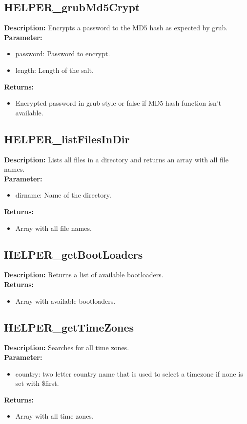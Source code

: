 \subsection{HELPER\_grubMd5Crypt}
\textbf{Description:} Encrypts a password to the MD5 hash as expected by grub.\\
\textbf{Parameter:}
\begin{itemize}
\item password: Password to encrypt.
\item length: Length of the salt.
\end{itemize}
\textbf{Returns:}
\begin{itemize}
\item Encrypted password in grub style or false if MD5 hash function isn't available.
\end{itemize}

\subsection{HELPER\_listFilesInDir}
\textbf{Description:} Lists all files in a directory and returns an array with all file names.\\
\textbf{Parameter:}
\begin{itemize}
\item dirname: Name of the directory.
\end{itemize}
\textbf{Returns:}
\begin{itemize}
\item Array with all file names.
\end{itemize}

\subsection{HELPER\_getBootLoaders}
\textbf{Description:} Returns a list of available bootloaders.\\
\textbf{Returns:}
\begin{itemize}
\item Array with available bootloaders.
\end{itemize}

\subsection{HELPER\_getTimeZones}
\textbf{Description:} Searches for all time zones.\\
\textbf{Parameter:}
\begin{itemize}
\item country: two letter country name that is used to select a timezone if none is set with \$first.
\end{itemize}
\textbf{Returns:}
\begin{itemize}
\item Array with all time zones.
\end{itemize}

